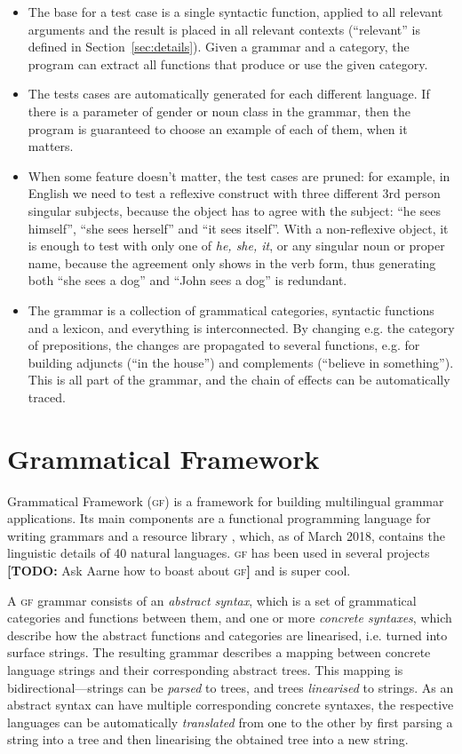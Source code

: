 \documentclass[11pt]{article}
\def\gf{\textsc{gf}}
\newcommand{\todo}[1]{{\color{cyan}\textbf{[TODO: }#1\textbf{]}}}
\begin{document}
\begin{itemize}
\item The base for a test case is a single syntactic function, applied
  to all relevant arguments and the result is placed in all relevant
  contexts (``relevant'' is defined in
  Section~\ref{sec:details}). Given a grammar and a category, the
  program can extract all functions that produce or use the given category. 
\item The tests cases are automatically generated for each different
  language. If there is a parameter of gender or noun class in the
  grammar, then the program is guaranteed to choose an example of each
  of them, when it matters.
\item When some feature doesn't matter, the test cases are pruned: for
  example, in English we need to test a reflexive construct with three
  different 3rd person singular subjects, because the object has to
  agree with the subject: ``he sees himself'', ``she sees herself''
  and ``it sees itself''. With a non-reflexive object, it is
  enough to test with only one of \emph{he, she, it}, or any singular
  noun or proper name, because the agreement only shows in the verb
  form, thus generating both ``she sees a dog'' and ``John sees a
  dog'' is redundant.
\item The grammar is a collection of grammatical categories, syntactic
  functions and a lexicon, and everything is interconnected. By
  changing e.g. the category of prepositions, the changes are
  propagated to several functions, e.g. for building adjuncts (``in
  the house'') and complements (``believe in something''). This is
  all part of the grammar, and the chain of effects can be
  automatically traced. 
\end{itemize}


\section{Grammatical Framework}
Grammatical Framework (\gf) \cite{ranta2004gf} 
is a framework for building multilingual grammar applications. Its main
components are a functional programming language for writing grammars
and a resource library \cite{ranta2009rgl}, which, as of March 2018,
contains the linguistic details of 40 natural languages. \gf{} has
been used in several projects \todo{Ask Aarne how to boast about \gf} and
is super cool.

A \gf{} grammar consists of an \emph{abstract syntax}, which is a set
of grammatical categories and functions between them, and one or more
\emph{concrete syntaxes}, which describe how the abstract functions
and categories are linearised, i.e. turned into surface strings. The
resulting grammar describes a mapping between concrete language
strings and their corresponding abstract trees. This mapping is
bidirectional---strings can be \emph{parsed} to trees, and trees
\emph{linearised} to strings. As an abstract syntax can have multiple
corresponding concrete syntaxes, the respective languages can be
automatically \emph{translated} from one to the other by first parsing
a string into a tree and then linearising the obtained tree into a new
string. 
\end{document}
